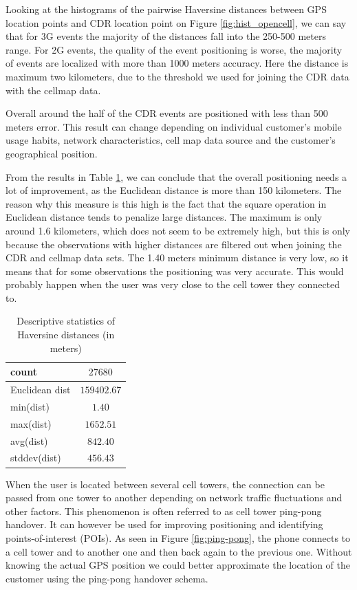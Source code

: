 Looking at the histograms of the pairwise Haversine distances between GPS location points and CDR location point on Figure \ref{fig:hist_opencell}, we can say that for 3G events the majority of the distances fall into the 250-500 meters range. For 2G events, the quality of the event positioning is worse, the majority of events are localized with more than 1000 meters accuracy. Here the distance is maximum two kilometers, due to the threshold we used for joining the CDR data with the cellmap data.

Overall around the half of the CDR events are positioned with less than 500 meters error. This result can change depending on individual customer's mobile usage habits, network characteristics, cell map data source and the customer's geographical position.

From the results in Table \ref{tab:dist_stats}, we can conclude that the overall positioning needs a lot of improvement, as the Euclidean distance is more than 150 kilometers. The reason why this measure is this high is the fact that the square operation in Euclidean distance tends to penalize large distances. The maximum is only around 1.6 kilometers, which does not seem to be extremely high, but this is only because the observations with higher distances are filtered out when joining the CDR and cellmap data sets. 
The 1.40 meters minimum distance is very low, so it means that for some observations the positioning was very accurate. This would probably happen when the user was very close to the cell tower they connected to. 

\begin{table}[h]
    \centering
    \begin{tabular}{|l|c|}
        \hline 
        count & $27680$ \\
        \hline
        Euclidean dist & $159402.67$ \\
        \hline
        min(dist) &  $1.40$\\
        \hline
        max(dist) &   $1652.51$\\
        \hline
        avg(dist) &  $842.40$\\
        \hline
        stddev(dist) &  $456.43$\\
        \hline
    \end{tabular}
    \caption{Descriptive statistics of Haversine distances (in meters)}
    \label{tab:dist_stats}
\end{table}

When the user is located between several cell towers, the connection can be passed from one tower to another depending on network traffic fluctuations and other factors. This phenomenon is often referred to as cell tower ping-pong handover. It can however be used for improving positioning and identifying points-of-interest (POIs). As seen in Figure \ref{fig:ping-pong}, the phone connects to a cell tower and to another one and then back again to the previous one. Without knowing the actual GPS position we could better approximate the location of the customer using the ping-pong handover schema.

